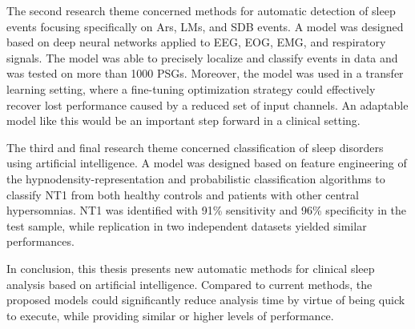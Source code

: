 The second research theme concerned methods for automatic detection of sleep events focusing specifically on \acp{Ar}, \acp{LM}, and \ac{SDB} events.
A model was designed based on deep neural networks applied to \ac{EEG}, \ac{EOG}, \ac{EMG}, and respiratory signals.
The model was able to precisely localize and classify events in data and was tested on more than 1000 \acp{PSG}.
Moreover, the model was used in a transfer learning setting, where a fine-tuning optimization strategy could effectively recover lost performance caused by a reduced set of input channels.
An adaptable model like this would be an important step forward in a clinical setting.

The third and final research theme concerned classification of sleep disorders using artificial intelligence.
A model was designed based on feature engineering of the hypnodensity-representation and probabilistic classification algorithms to classify \ac{NT1} from both healthy controls and patients with other central hypersomnias. 
\Ac{NT1} was identified with 91\% sensitivity and 96\% specificity in the test sample, while replication in two independent datasets yielded similar performances. 


In conclusion, this thesis presents new automatic methods for clinical sleep analysis based on artificial intelligence. 
Compared to current methods, the proposed models could significantly reduce analysis time by virtue of being quick to execute, while providing similar or higher levels of performance.



\endgroup
